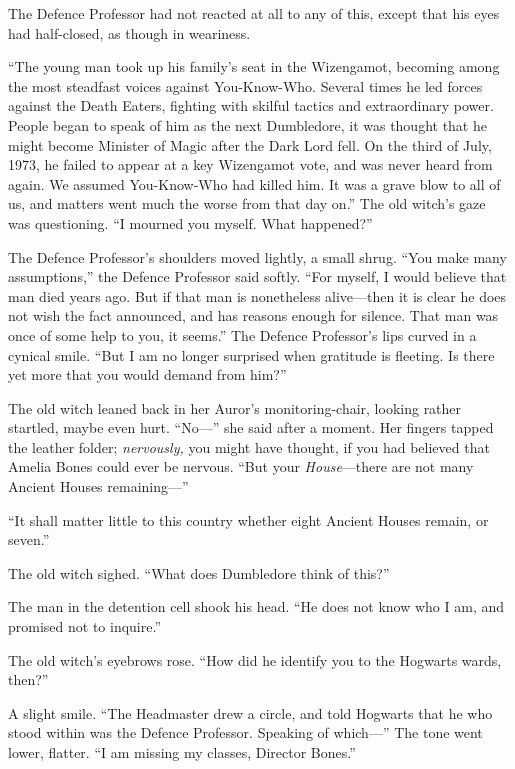 The Defence Professor had not reacted at all to any of this, except that
his eyes had half-closed, as though in weariness.

``The young man took up his family's seat in the Wizengamot, becoming
among the most steadfast voices against You-Know-Who. Several times he
led forces against the Death Eaters, fighting with skilful tactics and
extraordinary power. People began to speak of him as the next
Dumbledore, it was thought that he might become Minister of Magic after
the Dark Lord fell. On the third of July, 1973, he failed to appear at a
key Wizengamot vote, and was never heard from again. We assumed
You-Know-Who had killed him. It was a grave blow to all of us, and
matters went much the worse from that day on.'' The old witch's gaze was
questioning. ``I mourned you myself. What happened?''

The Defence Professor's shoulders moved lightly, a small shrug. ``You
make many assumptions,'' the Defence Professor said softly. ``For
myself, I would believe that man died years ago. But if that man is
nonetheless alive---then it is clear he does not wish the fact
announced, and has reasons enough for silence. That man was once of some
help to you, it seems.'' The Defence Professor's lips curved in a
cynical smile. ``But I am no longer surprised when gratitude is
fleeting. Is there yet more that you would demand from him?''

The old witch leaned back in her Auror's monitoring-chair, looking
rather startled, maybe even hurt. ``No---'' she said after a moment. Her
fingers tapped the leather folder; \emph{nervously,} you might have
thought, if you had believed that Amelia Bones could ever be nervous.
``But your \emph{House}---there are not many Ancient Houses
remaining---''

``It shall matter little to this country whether eight Ancient Houses
remain, or seven.''

The old witch sighed. ``What does Dumbledore think of this?''

The man in the detention cell shook his head. ``He does not know who I
am, and promised not to inquire.''

The old witch's eyebrows rose. ``How did he identify you to the Hogwarts
wards, then?''

A slight smile. ``The Headmaster drew a circle, and told Hogwarts that
he who stood within was the Defence Professor. Speaking of which---''
The tone went lower, flatter. ``I am missing my classes, Director
Bones.''

